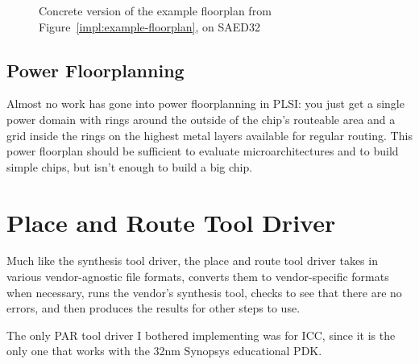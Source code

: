 \documentclass{article}
\begin{document}
\begin{figure}
  \caption{Concrete version of the example floorplan from Figure~\ref{impl:example-floorplan}, on SAED32}
  \label{impl:example-floorplan-saed32}
\end{figure}

\subsection{Power Floorplanning}

Almost no work has gone into power floorplanning in PLSI: you just get a single
power domain with rings around the outside of the chip's routeable area and a
grid inside the rings on the highest metal layers available for regular
routing.  This power floorplan should be sufficient to evaluate
microarchitectures and to build simple chips, but isn't enough to build
a big chip.

\section{Place and Route Tool Driver}

Much like the synthesis tool driver, the place and route tool driver takes in
various vendor-agnostic file formats, converts them to vendor-specific formats
when necessary, runs the vendor's synthesis tool, checks to see that there are
no errors, and then produces the results for other steps to use.

The only PAR tool driver I bothered implementing was for ICC, since it is the
only one that works with the 32nm Synopsys educational PDK.
\end{document}
